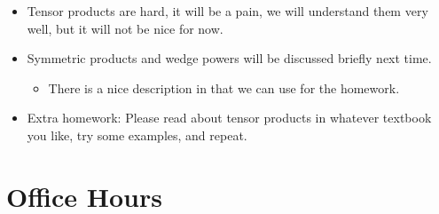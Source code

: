 \documentclass[../notes.tex]{subfiles}
\begin{document}
\begin{itemize}
    \item Tensor products are hard, it will be a pain, we will understand them very well, but it will not be nice for now.
    \item Symmetric products and wedge powers will be discussed briefly next time.
    \begin{itemize}
        \item There is a nice description in \textcite{bib:Serre} that we can use for the homework.
    \end{itemize}
    \item Extra homework: Please read about tensor products in whatever textbook you like, try some examples, and repeat.
\end{itemize}



\section{Office Hours}
\end{document}
